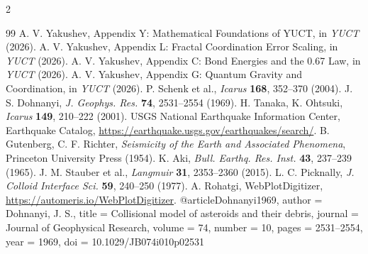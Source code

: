 \documentclass[11pt,a4paper]{article}
\begin{document}
\begin{multicols}{2}
		\begin{thebibliography}{99}
			 A. V. Yakushev, Appendix Y: Mathematical Foundations of YUCT, in \emph{YUCT} (2026).
			 A. V. Yakushev, Appendix L: Fractal Coordination Error Scaling, in \emph{YUCT} (2026).
			 A. V. Yakushev, Appendix C: Bond Energies and the 0.67 Law, in \emph{YUCT} (2026).
			 A. V. Yakushev, Appendix G: Quantum Gravity and Coordination, in \emph{YUCT} (2026).
			 P. Schenk et al., \emph{Icarus} \textbf{168}, 352–370 (2004).
			 J. S. Dohnanyi, \emph{J. Geophys. Res.} \textbf{74}, 2531–2554 (1969).
			 H. Tanaka, K. Ohtsuki, \emph{Icarus} \textbf{149}, 210–222 (2001).
			 USGS National Earthquake Information Center, Earthquake Catalog, \url{https://earthquake.usgs.gov/earthquakes/search/}.
			 B. Gutenberg, C. F. Richter, \emph{Seismicity of the Earth and Associated Phenomena}, Princeton University Press (1954).
			 K. Aki, \emph{Bull. Earthq. Res. Inst.} \textbf{43}, 237–239 (1965).
			 J. M. Stauber et al., \emph{Langmuir} \textbf{31}, 2353–2360 (2015).
			 L. C. Picknally, \emph{J. Colloid Interface Sci.} \textbf{59}, 240–250 (1977).
			 A. Rohatgi, WebPlotDigitizer, \url{https://automeris.io/WebPlotDigitizer}.
			@article{Dohnanyi1969,
				author = {Dohnanyi, J. S.},
				title = {Collisional model of asteroids and their debris},
				journal = {Journal of Geophysical Research},
				volume = {74},
				number = {10},
				pages = {2531--2554},
				year = {1969},
				doi = {10.1029/JB074i010p02531}
			}
		\end{thebibliography}
		
	\end{multicols}
\end{document}
